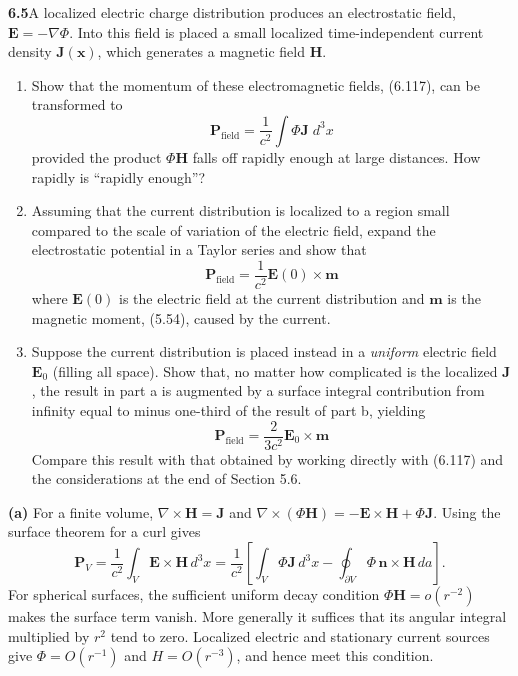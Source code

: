 \par\bigskip
\noindent\textbf{6.5}\quad A localized electric charge distribution produces an electrostatic field, $\mathbf{E}=-\nabla\Phi$. Into this field is placed a small localized time-independent current density $\mathbf{J}(\mathbf{x})$, which generates a magnetic field $\mathbf{H}$.
\begin{enumerate}
\item[(a)] Show that the momentum of these electromagnetic fields, (6.117), can be transformed to
\[
\mathbf{P}_{\mathrm{field}}=\frac{1}{c^{2}}\int\Phi\mathbf{J}\;d^{3}x
\]
provided the product $\Phi\mathbf{H}$ falls off rapidly enough at large distances. How rapidly is ``rapidly enough''?
\item[(b)] Assuming that the current distribution is localized to a region small compared to the scale of variation of the electric field, expand the electrostatic potential in a Taylor series and show that
\[
\mathbf{P}_{\mathrm{field}}=\frac{1}{c^{2}}\mathbf{E}(0)\times\mathbf{m}
\]
where $\mathbf{E}(0)$ is the electric field at the current distribution and $\mathbf{m}$ is the magnetic moment, (5.54), caused by the current.
\item[(c)] Suppose the current distribution is placed instead in a \emph{uniform} electric field $\mathbf{E}_{0}$ (filling all space).  Show that, no matter how complicated is the localized $\mathbf{J}$, the result in part a is augmented by a surface integral contribution from infinity equal to minus one-third of the result of part b, yielding
\[
\mathbf{P}_{\mathrm{field}}=\frac{2}{3c^{2}}\mathbf{E}_{0}\times\mathbf{m}
\]
Compare this result with that obtained by working directly with (6.117) and the considerations at the end of Section 5.6.
\end{enumerate}
\solution

\textbf{(a)} For a finite volume, $\nabla\times\mathbf H=\mathbf J$ and
$\nabla\times(\Phi\mathbf H)=-\mathbf E\times\mathbf H+\Phi\mathbf J$.
Using the surface theorem for a curl gives
\[
\mathbf P_V=\frac1{c^2}\int_V\mathbf E\times\mathbf H\,d^3x
=\frac1{c^2}\left[\int_V\Phi\mathbf J\,d^3x
-\oint_{\partial V}\Phi\,\mathbf n\times\mathbf H\,da\right].
\]
For spherical surfaces, the sufficient uniform decay condition
$\Phi\mathbf H=o(r^{-2})$ makes the surface term vanish. More generally
it suffices that its angular integral multiplied by $r^2$ tend to zero.
Localized electric and stationary current sources give $\Phi=O(r^{-1})$
and $H=O(r^{-3})$, and hence meet this condition.

